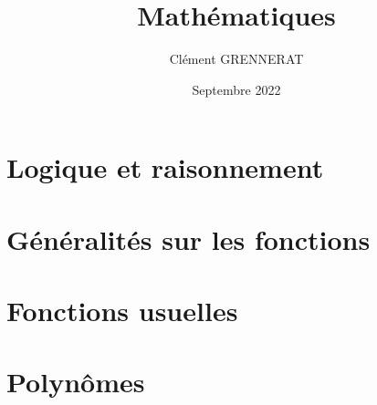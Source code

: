 \documentclass[13pt, twoside, a4paper, french]{report}
\newcommand*{\getSubject}{Mathématiques}
\begin{document}
\title{\getSubject}
\author{Clément GRENNERAT}
\date{Septembre 2022}


\chapter{Logique et raisonnement}\label{ch:logique-et-raisonnement}
  


\chapter{Généralités sur les fonctions}\label{ch:generalites-sur-les-fonctions}
  


\chapter{Fonctions usuelles}\label{ch:fonctions-usuelles}
  


\chapter{Polynômes}\label{ch:polynomes}
  
\end{document}

